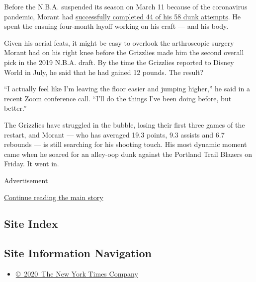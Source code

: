 Before the N.B.A. suspended its season on March 11 because of the
coronavirus pandemic, Morant had
\href{https://stats.nba.com/player/1629630/shooting/}{successfully
completed 44 of his 58 dunk attempts}. He spent the ensuing four-month
layoff working on his craft --- and his body.

Given his aerial feats, it might be easy to overlook the arthroscopic
surgery Morant had on his right knee before the Grizzlies made him the
second overall pick in the 2019 N.B.A. draft. By the time the Grizzlies
reported to Disney World in July, he said that he had gained 12 pounds.
The result?

``I actually feel like I'm leaving the floor easier and jumping
higher,'' he said in a recent Zoom conference call. ``I'll do the things
I've been doing before, but better.''

The Grizzlies have struggled in the bubble, losing their first three
games of the restart, and Morant --- who has averaged 19.3 points, 9.3
assists and 6.7 rebounds --- is still searching for his shooting touch.
His most dynamic moment came when he soared for an alley-oop dunk
against the Portland Trail Blazers on Friday. It went in.

Advertisement

\protect\hyperlink{after-bottom}{Continue reading the main story}

\hypertarget{site-index}{%
\subsection{Site Index}\label{site-index}}

\hypertarget{site-information-navigation}{%
\subsection{Site Information
Navigation}\label{site-information-navigation}}

\begin{itemize}
\tightlist
\item
  \href{https://help.nytimes.com/hc/en-us/articles/115014792127-Copyright-notice}{©~2020~The
  New York Times Company}
\end{itemize}

